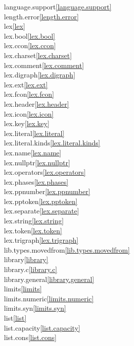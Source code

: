 \begin{multicols}{2}
language.support\quad\ref{language.support}\\
length.error\quad\ref{length.error}\\
lex\quad\ref{lex}\\
lex.bool\quad\ref{lex.bool}\\
lex.ccon\quad\ref{lex.ccon}\\
lex.charset\quad\ref{lex.charset}\\
lex.comment\quad\ref{lex.comment}\\
lex.digraph\quad\ref{lex.digraph}\\
lex.ext\quad\ref{lex.ext}\\
lex.fcon\quad\ref{lex.fcon}\\
lex.header\quad\ref{lex.header}\\
lex.icon\quad\ref{lex.icon}\\
lex.key\quad\ref{lex.key}\\
lex.literal\quad\ref{lex.literal}\\
lex.literal.kinds\quad\ref{lex.literal.kinds}\\
lex.name\quad\ref{lex.name}\\
lex.nullptr\quad\ref{lex.nullptr}\\
lex.operators\quad\ref{lex.operators}\\
lex.phases\quad\ref{lex.phases}\\
lex.ppnumber\quad\ref{lex.ppnumber}\\
lex.pptoken\quad\ref{lex.pptoken}\\
lex.separate\quad\ref{lex.separate}\\
lex.string\quad\ref{lex.string}\\
lex.token\quad\ref{lex.token}\\
lex.trigraph\quad\ref{lex.trigraph}\\
lib.types.movedfrom\quad\ref{lib.types.movedfrom}\\
library\quad\ref{library}\\
library.c\quad\ref{library.c}\\
library.general\quad\ref{library.general}\\
limits\quad\ref{limits}\\
limits.numeric\quad\ref{limits.numeric}\\
limits.syn\quad\ref{limits.syn}\\
list\quad\ref{list}\\
list.capacity\quad\ref{list.capacity}\\
list.cons\quad\ref{list.cons}\\

\end{multicols}
